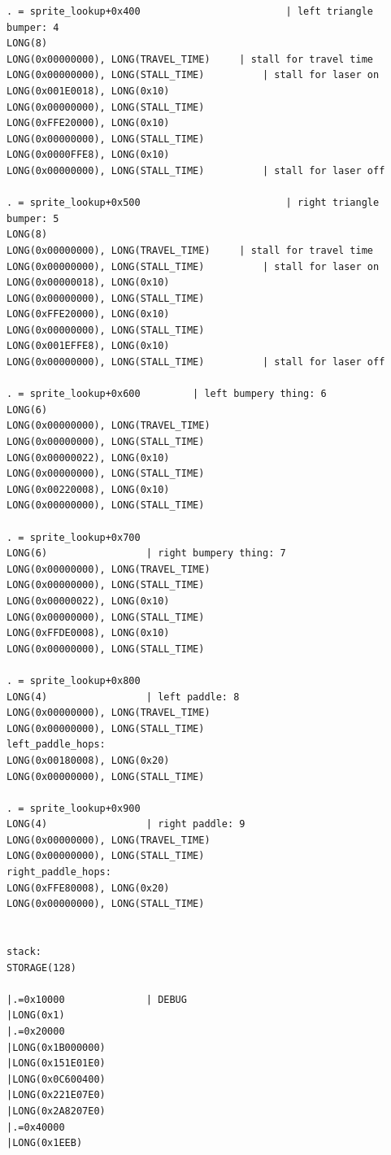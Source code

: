 \documentclass{article}
\begin{document}
\begin{lstlisting}
. = sprite_lookup+0x400							| left triangle bumper: 4
LONG(8)
LONG(0x00000000), LONG(TRAVEL_TIME)    	| stall for travel time
LONG(0x00000000), LONG(STALL_TIME)    		| stall for laser on
LONG(0x001E0018), LONG(0x10)
LONG(0x00000000), LONG(STALL_TIME)
LONG(0xFFE20000), LONG(0x10)
LONG(0x00000000), LONG(STALL_TIME)
LONG(0x0000FFE8), LONG(0x10)
LONG(0x00000000), LONG(STALL_TIME)    		| stall for laser off

. = sprite_lookup+0x500							| right triangle bumper: 5
LONG(8)
LONG(0x00000000), LONG(TRAVEL_TIME)    	| stall for travel time
LONG(0x00000000), LONG(STALL_TIME)    		| stall for laser on
LONG(0x00000018), LONG(0x10)
LONG(0x00000000), LONG(STALL_TIME)
LONG(0xFFE20000), LONG(0x10)
LONG(0x00000000), LONG(STALL_TIME)
LONG(0x001EFFE8), LONG(0x10)
LONG(0x00000000), LONG(STALL_TIME)    		| stall for laser off

. = sprite_lookup+0x600			| left bumpery thing: 6
LONG(6)
LONG(0x00000000), LONG(TRAVEL_TIME)
LONG(0x00000000), LONG(STALL_TIME)
LONG(0x00000022), LONG(0x10)
LONG(0x00000000), LONG(STALL_TIME)
LONG(0x00220008), LONG(0x10)
LONG(0x00000000), LONG(STALL_TIME)

. = sprite_lookup+0x700
LONG(6)					| right bumpery thing: 7
LONG(0x00000000), LONG(TRAVEL_TIME)
LONG(0x00000000), LONG(STALL_TIME)
LONG(0x00000022), LONG(0x10)
LONG(0x00000000), LONG(STALL_TIME)
LONG(0xFFDE0008), LONG(0x10)
LONG(0x00000000), LONG(STALL_TIME)

. = sprite_lookup+0x800
LONG(4)					| left paddle: 8
LONG(0x00000000), LONG(TRAVEL_TIME)
LONG(0x00000000), LONG(STALL_TIME)
left_paddle_hops:
LONG(0x00180008), LONG(0x20)
LONG(0x00000000), LONG(STALL_TIME)

. = sprite_lookup+0x900
LONG(4)					| right paddle: 9
LONG(0x00000000), LONG(TRAVEL_TIME)
LONG(0x00000000), LONG(STALL_TIME)
right_paddle_hops:
LONG(0xFFE80008), LONG(0x20)
LONG(0x00000000), LONG(STALL_TIME)


stack:
STORAGE(128)

|.=0x10000				| DEBUG
|LONG(0x1)
|.=0x20000
|LONG(0x1B000000)
|LONG(0x151E01E0)
|LONG(0x0C600400)
|LONG(0x221E07E0)
|LONG(0x2A8207E0)
|.=0x40000
|LONG(0x1EEB)
\end{lstlisting}
\end{document}
